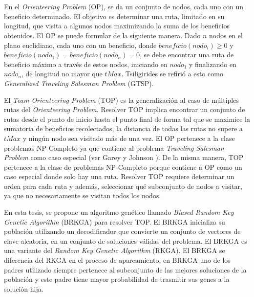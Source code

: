 
\chapter*{\tituloAbstractEs}

\noindent En el \textit{Orienteering Problem} (OP), se da un conjunto de nodos, cada uno con un beneficio determinado. El objetivo es determinar una ruta, limitado en su longitud, que visita a algunos nodos maximizando la suma de los beneficios obtenidos. El OP se puede formular de la siguiente manera. Dado $n$ nodos en el plano euclidiano, cada uno con un beneficio, donde $beneficio(nodo_i) \geq 0$ y $beneficio(nodo_1) = beneficio(nodo_n) = 0$, se debe encontrar una ruta de beneficio máximo a través de estos nodos, iniciando en $nodo_1$ y finalizando en $nodo_n$, de longitud no mayor que $tMax$. Tsiligirides \cite{Tsiligirides} se refirió a esto como \textit{Generalized Traveling Salesman Problem} (GTSP).

\bigskip

El \textit{Team Orienteering Problem} (TOP) es la generalización al caso de múltiples rutas del \textit{Orienteering Problem}. Resolver TOP implica encontrar un conjunto de rutas desde el punto de inicio hasta el punto final de forma tal que se maximice la sumatoria de beneficios recolectados, la distancia de todas las rutas no supere a $tMax$ y ningún nodo sea visitado más de una vez. El OP pertenece a la clase problemas NP-Completo ya que contiene al problema \textit{Traveling Salesman Problem} como caso especial (ver Garey y Johnson \cite{GareyJohnson}). De la misma manera, TOP pertenece a la clase de problemas NP-Completo porque contiene a OP como un caso especial donde solo hay una ruta. Resolver TOP requiere determinar un orden para cada ruta y además, seleccionar qué subconjunto de nodos a visitar, ya que no necesariamente se visitan todos los nodos.

\bigskip

En esta tesis, se propone un algoritmo genético llamado \textit{Biased Random Key Genetic Algorithm} (BRKGA) para resolver TOP. El BRKGA inicializa su población utilizando un decodificador que convierte un conjunto de vectores de clave aleatoria, en un conjunto de soluciones válidas del problema. El BRKGA es una variante del \textit{Random Key Genetic Algorithm} (RKGA). El BRKGA se diferencia del RKGA en el proceso de apareamiento, en BRKGA uno de los padres utilizado siempre pertenece al subconjunto de las mejores soluciones de la población y este padre tiene mayor probabilidad de trasmitir sus genes a la solución hija.

